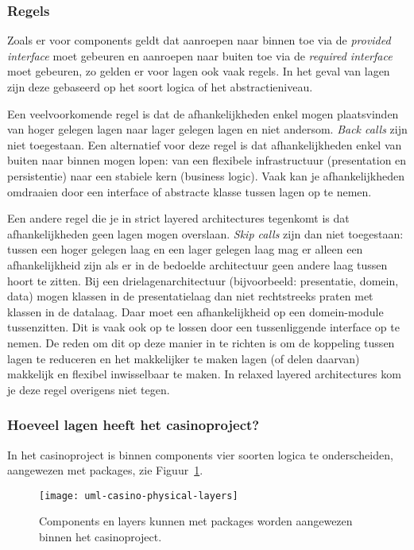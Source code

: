 \subsubsection{Regels}
Zoals er voor components geldt dat 
aanroepen naar binnen toe via de \emph{provided interface} moet gebeuren 
en aanroepen naar buiten toe via de \emph{required interface} moet gebeuren,
zo gelden er voor lagen ook vaak regels. In het geval van 
lagen zijn deze gebaseerd op het soort logica of het abstractieniveau.

Een veelvoorkomende regel is dat de afhankelijkheden enkel mogen plaatsvinden 
van hoger gelegen lagen naar lager gelegen lagen en niet andersom. 
\emph{Back calls} zijn niet toegestaan. 
Een alternatief voor deze regel is dat afhankelijkheden enkel van buiten naar binnen
mogen lopen: van een flexibele infrastructuur (presentation en persistentie) 
naar een stabiele kern (business logic). Vaak kan je afhankelijkheden omdraaien door 
een interface of abstracte klasse tussen lagen op te nemen.

Een andere regel die je in strict layered architectures tegenkomt is dat 
afhankelijkheden geen lagen mogen overslaan. 
\emph{Skip calls} zijn dan niet toegestaan: 
tussen een hoger gelegen laag en een lager gelegen laag 
mag er alleen een afhankelijkheid zijn als er in de bedoelde
architectuur geen andere laag tussen hoort te zitten. 
Bij een drielagenarchitectuur (bijvoorbeeld: presentatie, domein, data)
mogen klassen in de presentatielaag dan niet rechtstreeks praten 
met klassen in de datalaag. Daar moet een afhankelijkheid op een
domein-module tussenzitten. Dit is vaak ook op te lossen door een tussenliggende 
interface op te nemen. De reden om dit op deze manier in te richten is om 
de koppeling tussen lagen te reduceren en het makkelijker te maken lagen (of delen daarvan)
makkelijk en flexibel inwisselbaar te maken. In relaxed layered architectures 
kom je deze regel overigens niet tegen. 

\subsubsection{Hoeveel lagen heeft het casinoproject?}
In het casinoproject is binnen components vier soorten logica te onderscheiden, 
aangewezen met packages, zie Figuur~\ref{fig:uml-casino-physical-layers}.

\begin{figure}[H]
    \centering
    \texttt{[image: uml-casino-physical-layers]}
    \caption{Components en layers kunnen met packages worden aangewezen binnen het casinoproject.}
    \label{fig:uml-casino-physical-layers}
\end{figure}

